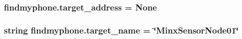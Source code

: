 \subsubsection[{\texorpdfstring{target\+\_\+address}{target_address}}]{\setlength{\rightskip}{0pt plus 5cm}findmyphone.\+target\+\_\+address = None}\hypertarget{namespacefindmyphone_a8af8877c5d59f0e0cea959d3fb0611aa}{}\label{namespacefindmyphone_a8af8877c5d59f0e0cea959d3fb0611aa}
\subsubsection[{\texorpdfstring{target\+\_\+name}{target_name}}]{\setlength{\rightskip}{0pt plus 5cm}string findmyphone.\+target\+\_\+name = \char`\"{}Minx\+Sensor\+Node01\char`\"{}}\hypertarget{namespacefindmyphone_aa120ec9c3e51eeeae0130cf9ce402672}{}\label{namespacefindmyphone_aa120ec9c3e51eeeae0130cf9ce402672}
